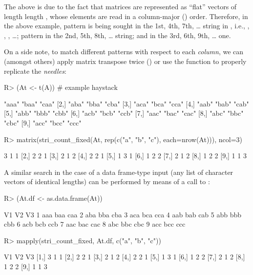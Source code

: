 \documentclass[nojss]{jss}
\begin{document}
\begin{itemize}
The above is due to the fact that matrices are
represented as ``flat'' vectors of length length ,
whose elements are read in a column-major () order.
Therefore, in the above example,
pattern  is being sought in the 1st, 4th, 7th,
\dots{} string in , i.e., , , , \dots;
pattern  in the 2nd, 5th, 8th, \dots{} string;
and  in the 3rd, 6th, 9th, \dots{} one.

\medskip
On a side note, to match different patterns
with respect to each \textit{column}, we can (amongst others)
apply matrix transpose twice ()
or use
the  function
to properly replicate the \textit{needles}:

\begin{Schunk}
\begin{Sinput}
R> (At <- t(A))  # example haystack
\end{Sinput}
\begin{Soutput}
      [,1]  [,2]  [,3]
 [1,] "aaa" "baa" "caa"
 [2,] "aba" "bba" "cba"
 [3,] "aca" "bca" "cca"
 [4,] "aab" "bab" "cab"
 [5,] "abb" "bbb" "cbb"
 [6,] "acb" "bcb" "ccb"
 [7,] "aac" "bac" "cac"
 [8,] "abc" "bbc" "cbc"
 [9,] "acc" "bcc" "ccc"
\end{Soutput}
\begin{Sinput}
R> matrix(stri_count_fixed(At, rep(c("a", "b", "c"), each=nrow(At))), ncol=3)
\end{Sinput}
\begin{Soutput}
      [,1] [,2] [,3]
 [1,]    3    1    1
 [2,]    2    2    1
 [3,]    2    1    2
 [4,]    2    2    1
 [5,]    1    3    1
 [6,]    1    2    2
 [7,]    2    1    2
 [8,]    1    2    2
 [9,]    1    1    3
\end{Soutput}
\end{Schunk}

A similar search in the case of a data frame-type input
(any list of character vectors of identical lengths)
can be performed by means of a call to :



\begin{Schunk}
\begin{Sinput}
R> (At.df <- as.data.frame(At))
\end{Sinput}
\begin{Soutput}
   V1  V2  V3
1 aaa baa caa
2 aba bba cba
3 aca bca cca
4 aab bab cab
5 abb bbb cbb
6 acb bcb ccb
7 aac bac cac
8 abc bbc cbc
9 acc bcc ccc
\end{Soutput}
\begin{Sinput}
R> mapply(stri_count_fixed, At.df, c("a", "b", "c"))
\end{Sinput}
\begin{Soutput}
      V1 V2 V3
 [1,]  3  1  1
 [2,]  2  2  1
 [3,]  2  1  2
 [4,]  2  2  1
 [5,]  1  3  1
 [6,]  1  2  2
 [7,]  2  1  2
 [8,]  1  2  2
 [9,]  1  1  3
\end{Soutput}
\end{Schunk}


\end{itemize}
\end{document}
